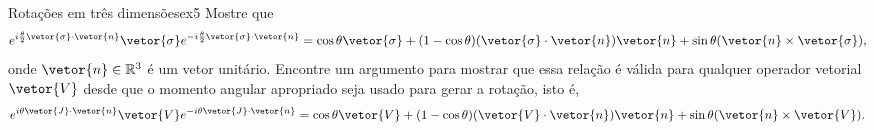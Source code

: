 \begin{exercício}{Rotações em três dimensões}{ex5}
    Mostre que
    \begin{equation*}
        e^{i\frac{\theta}{2} \vetor{\sigma} \cdot \vetor{n}} \vetor{\sigma} e^{-i\frac{\theta}{2} \vetor{\sigma} \cdot \vetor{n}} = \cos\theta \vetor{\sigma} + (1 - \cos\theta)(\vetor{\sigma} \cdot \vetor{n})\vetor{n} + \sin\theta (\vetor{n} \times \vetor{\sigma}),
    \end{equation*}
    onde \(\vetor{n} \in \mathbb{R}^3\) é um vetor unitário. Encontre um argumento para mostrar que essa relação é válida para qualquer operador vetorial \(\vetor{V}\) desde que o momento angular apropriado seja usado para gerar a rotação, isto é,
    \begin{equation*}
        e^{i\theta \vetor{J} \cdot \vetor{n}} \vetor{V} e^{-i\theta \vetor{J} \cdot \vetor{n}} = \cos\theta \vetor{V} + (1 - \cos\theta)(\vetor{V} \cdot \vetor{n})\vetor{n} + \sin\theta (\vetor{n} \times \vetor{V}).
    \end{equation*}
\end{exercício}
